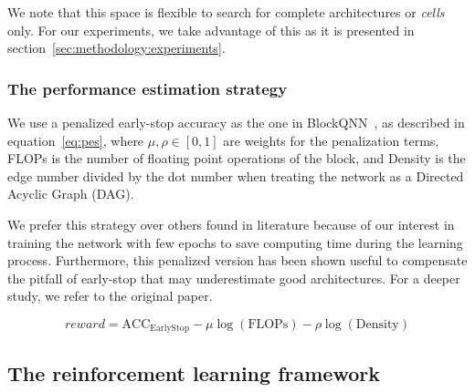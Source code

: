 We note that this space is flexible to search for complete architectures or \textit{cells} only. For our experiments, we take advantage of this as it is presented in section~\ref{sec:methodology:experiments}.

\subsubsection{The performance estimation strategy}\label{sec:methodology:pss}

We use a penalized early-stop accuracy as the one in BlockQNN~\citep{BlockQNN}, as described in equation~\ref{eq:pes}, where $\mu, \rho \in [0, 1]$ are weights for the penalization terms, FLOPs is the number of floating point operations of the block, and Density is the edge number divided by the dot number when treating the network as a Directed Acyclic Graph (DAG). 

We prefer this strategy over others found in literature because of our interest in training the network with few epochs to save computing time during the learning process. Furthermore, this penalized version has been shown useful to compensate the pitfall of early-stop that may underestimate good architectures. For a deeper study, we refer to the original paper.

\begin{equation}\label{eq:pes}
reward = \text{ACC}_\text{EarlyStop} - \mu \log(\text{FLOPs}) - \rho \log(\text{Density})
\end{equation}

\subsection{The reinforcement learning framework}\label{sec:methodology:rl}



